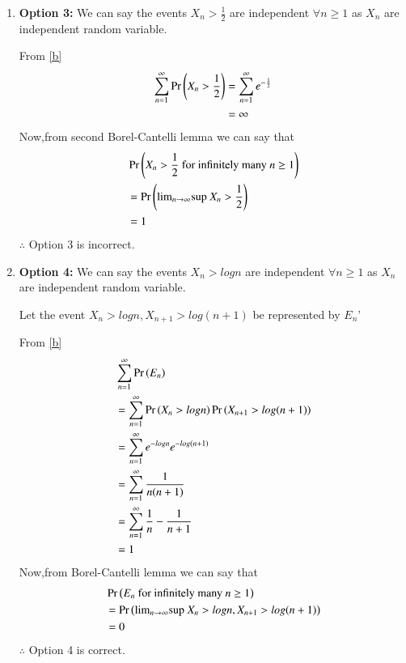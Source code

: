 \documentclass[journal,12pt,twocolumn]{IEEEtran}
\begin{document}
\begin{enumerate}
    \item \textbf{Option 3:} We can say the events $X_n>\frac{1}{2}$ are independent $\forall n\geq 1$ as $X_n$ are independent random variable.
    
    From \eqref{b}
    \begin{align}
        \sum_{n=1}^{\infty}\Pr\left(X_n > \frac{1}{2}\right) &= \sum_{n=1}^{\infty}e^{-\frac{1}{2}}\nonumber\\
                                            &= \infty\nonumber
    \end{align}
    Now,from second Borel-Cantelli lemma we can say that
    \begin{align}
        &\Pr\left(X_n>\frac{1}{2} \text{ for infinitely many }n\geq1\right)\nonumber\\
        &=\Pr\left(\text{lim}_{n \rightarrow \infty}\text{sup }X_n>\frac{1}{2}\right)\nonumber\\
        &=1\nonumber
    \end{align}
    $\therefore$ Option 3 is incorrect.
    \item \textbf{Option 4:} We can say the events $X_n>logn$ are independent $\forall n\geq 1$ as $X_n$ are independent random variable.
    
    Let the event $X_n > logn,X_{n+1}>log(n+1)$ be represented by $E_n$'
    
    From \eqref{b}
    \begin{align}
        &\sum_{n=1}^{\infty}\Pr\left(E_n\right)\nonumber\\
        &= \sum_{n=1}^{\infty}\Pr\left(X_n>logn\right)\Pr\left(X_{n+1}>log(n+1)\right)\nonumber\\
        &=\sum_{n=1}^{\infty}e^{-logn}e^{-log(n+1)}\nonumber\\
        &=\sum_{n=1}^{\infty}\frac{1}{n(n+1)}\nonumber\\
        &=\sum_{n=1}^{\infty}\frac{1}{n}-\frac{1}{n+1}\nonumber\\
        &=1
    \end{align}
    Now,from Borel-Cantelli lemma we can say that
    \begin{align}
        &\Pr\left(E_n\text{ for infinitely many }n\geq1\right)\nonumber\\
        &=\Pr\left(\text{lim}_{n \rightarrow \infty}\text{sup }X_n>logn,X_{n+1}>log(n+1)\right)\nonumber\\
        &=0\nonumber
    \end{align}
    $\therefore$ Option 4 is correct.
\end{enumerate}
\vspace{0.5cm}\centering {}
\end{document}
